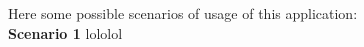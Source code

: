 Here some possible scenarios of usage of this application:\\
\bigbreak
\bigbreak
\textbf{\large Scenario 1}
\bigbreak
lololol